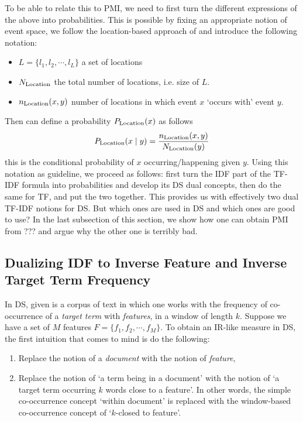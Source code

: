 To be able to relate this to PMI, we need to first turn the different expressions of the above into probabilities.  This is possible by fixing an appropriate notion of event space, we follow the location-based approach of \cite{ThomasBook} and introduce the following notation:

\begin{itemize}
\item $L = \{l_1, l_2, \cdots, l_L\}$ a set of locations
\item $N_{\textmd{Location}}$ the total number of locations, i.e. size  of $L$.
\item $n_{\textmd{Location}} (x,y)$ number of locations in which event $x$ `occurs with' event $y$.
\end{itemize}

Then can define a probability $P_{\textmd{Location}}(x)$ as follows
\[
P_{\textmd{Location}}  (x \mid y) = \frac{n_{\textmd{Location}}(x,y)}{N_{\textmd{Location}}(y)}
\]
 this is  the conditional probability of $x$ occurring/happening given $y$.  Using this notation as guideline, we proceed as follows:   first turn the IDF part of the TF-IDF formula into probabilities and develop its DS dual concepts, then do the same for TF, and  put the two together.  This provides us with effectively two dual TF-IDF notions for DS.  But which ones are used in DS and which ones are good to use? In the last subsection of this section, we show how one can obtain PMI from ??? and argue why the other  one is terribly bad. 


\subsection{Dualizing  IDF to Inverse Feature  and Inverse Target Term Frequency }
\label{subsec-IDF}


\medskip
In DS, given is a corpus of text in which one works with the frequency of co-occurrence of a \emph{target term} with \emph{features}, in a window of length $k$.  Suppose we have a set of  $M$ features  $F = \{f_1, f_2, \cdots, f_M\}$.  To obtain an IR-like measure in DS, the first intuition that comes to mind is do the following:

\begin{enumerate}
\item   Replace the notion of a  \emph{document}  with the notion of  \emph{feature}, 
\item  Replace the notion of `a term being in a document'  with the notion of `a target  term occurring $k$ words close to a feature'.  In other words,  the  simple co-occurrence concept `within document' is replaced with the window-based co-occurrence concept of  `$k$-closed to feature'. 
\end{enumerate}

